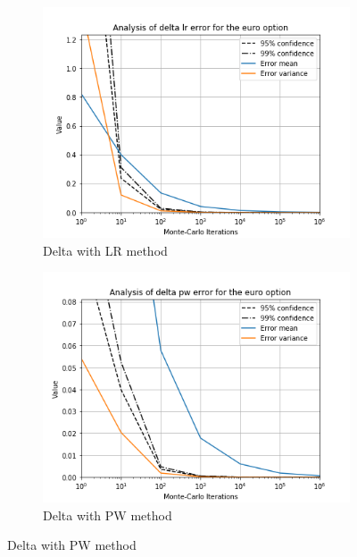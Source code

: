 \documentclass[11pt,a4paper,fleqn]{article}
\begin{document}
\begin{figure}[h!]
  \centering
      \begin{subfigure}[b]{0.45\textwidth}
          \includegraphics[width=\textwidth]{graphs/eurodeltalr.png}
          \caption{Delta with LR method}
      \end{subfigure}
      \begin{subfigure}[b]{0.45\textwidth}
          \includegraphics[width=\textwidth]{graphs/eurodeltapw.png}
          \caption{Delta with PW method}
      \end{subfigure}


\end{figure}
\end{document}
